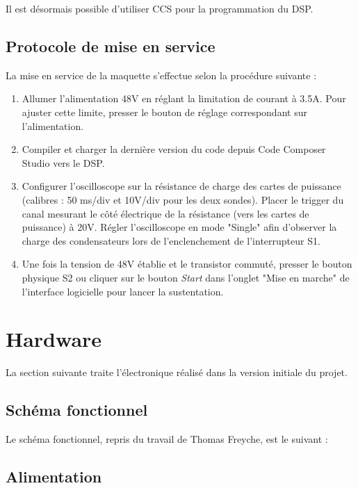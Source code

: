 
Il est désormais possible d'utiliser CCS pour la programmation du DSP.

\subsection{Protocole de mise en service}
La mise en service de la maquette s'effectue selon la procédure suivante :

\begin{enumerate}
    \item Allumer l'alimentation 48V en réglant la limitation de courant à 3.5A. Pour ajuster cette limite, presser le bouton de réglage correspondant sur l'alimentation.

    \item Compiler et charger la dernière version du code depuis Code Composer Studio vers le DSP.

    \item Configurer l'oscilloscope sur la résistance de charge des cartes de puissance (calibres : 50 ms/div et 10V/div pour les deux sondes). Placer le trigger du canal mesurant le côté électrique de la résistance (vers les cartes de puissance) à 20V. Régler l'oscilloscope en mode "Single" afin d'observer la charge des condensateurs lors de l'enclenchement de l'interrupteur S1.

    \item Une fois la tension de 48V établie et le transistor commuté, presser le bouton physique S2 ou cliquer sur le bouton \textit{Start} dans l'onglet "Mise en marche" de l'interface logicielle pour lancer la sustentation.
\end{enumerate}

\section{Hardware}
La section suivante traite l'électronique réalisé dans la version initiale du projet.

\subsection{Schéma fonctionnel}
Le schéma fonctionnel, repris du travail de Thomas Freyche, est le suivant :

\subsection{Alimentation}

